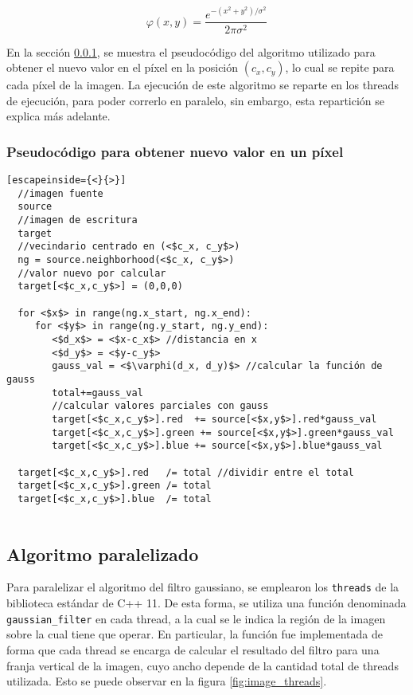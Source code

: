 \documentclass {article}
\begin{document}
\begin{equation}
  \varphi (x, y)= \frac{e^{-(x^2+y^2)/\sigma^2}}{2\pi \sigma^2} 
  \label{eq:bidiGauss}
\end{equation}

En la sección \ref{sec:pseudocodePixel}, se muestra el pseudocódigo del algoritmo utilizado para
obtener el nuevo valor en el píxel en la posición $(c_x, c_y)$, lo cual se repite para cada píxel de
la imagen. La ejecución de este algoritmo se reparte en los threads de ejecución, para poder
correrlo en paralelo, sin embargo, esta repartición se explica más adelante.


\subsubsection{Pseudocódigo para obtener nuevo valor en un píxel}
\label{sec:pseudocodePixel}

\begin{lstlisting}[escapeinside={<}{>}]
  //imagen fuente
  source
  //imagen de escritura
  target
  //vecindario centrado en (<$c_x, c_y$>)
  ng = source.neighborhood(<$c_x, c_y$>) 
  //valor nuevo por calcular
  target[<$c_x,c_y$>] = (0,0,0)

  for <$x$> in range(ng.x_start, ng.x_end):
     for <$y$> in range(ng.y_start, ng.y_end):
        <$d_x$> = <$x-c_x$> //distancia en x
        <$d_y$> = <$y-c_y$>
        gauss_val = <$\varphi(d_x, d_y)$> //calcular la función de gauss
        total+=gauss_val
        //calcular valores parciales con gauss
        target[<$c_x,c_y$>].red  += source[<$x,y$>].red*gauss_val 
        target[<$c_x,c_y$>].green += source[<$x,y$>].green*gauss_val
        target[<$c_x,c_y$>].blue += source[<$x,y$>].blue*gauss_val
  
  target[<$c_x,c_y$>].red   /= total //dividir entre el total
  target[<$c_x,c_y$>].green /= total
  target[<$c_x,c_y$>].blue  /= total
        
\end{lstlisting}

\subsection{Algoritmo paralelizado}
Para paralelizar el algoritmo del filtro gaussiano, se emplearon los \texttt{threads} de la
biblioteca estándar de C++ 11. De esta forma, se utiliza una función denominada
\texttt{gaussian\_filter} en cada thread, a la cual se le indica la región de la imagen sobre la
cual tiene que operar. En particular, la función fue implementada de forma que cada thread se
encarga de calcular el resultado del filtro para una franja vertical de la imagen, cuyo ancho
depende de la cantidad total de threads utilizada. Esto se puede observar en la figura
\ref{fig:image_threads}.
\end{document}
